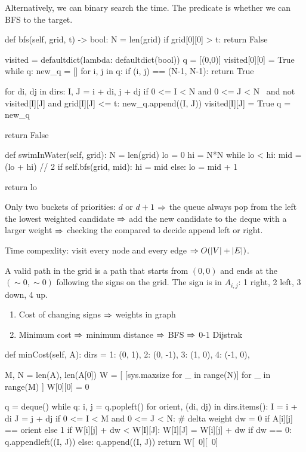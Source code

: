Alternatively, we can binary search the time. The predicate is whether we can BFS to the target. 
\begin{python}
def bfs(self, grid, t) -> bool:
  N = len(grid)
  if grid[0][0] > t: 
    return False
  
  visited = defaultdict(lambda: defaultdict(bool))
  q = [(0,0)]
  visited[0][0] = True
  while q:
    new_q = []
    for i, j in q:
      if (i, j) == (N-1, N-1):
        return True
      
      for di, dj in dirs:
        I, J = i + di, j + dj
        if 0 <= I < N and 0 <= J < N \
        and not visited[I][J] and grid[I][J] <= t:
          new_q.append((I, J))
          visited[I][J] = True
    q = new_q
    
  return False

def swimInWater(self, grid):
  N = len(grid)
  lo = 0
  hi = N*N
  while lo < hi:
    mid = (lo + hi) // 2
    if self.bfs(grid, mid):
      hi = mid
    else:
      lo = mid + 1

  return lo
\end{python}
 Only two buckets of priorities: $d$ or $d+1$ $\Rightarrow$ the queue always pop from the left the lowest weighted candidate $\Rightarrow$ add the new candidate to the deque with a larger weight $\Rightarrow$ checking the compared to decide append left or right. 

Time compexlity: visit every node and every edge $\Rightarrow O(|V| + |E|)$. 

 A valid path in the grid is a path that starts from $(0, 0)$ and ends at the $(\sim 0, \sim 0)$ following the signs on the grid. The sign is in $A_{i,j}$: 1 right, 2 left, 3 down, 4 up. 

\begin{enumerate}
\item Cost of changing signs $\Rightarrow$ weights in graph 
\item Minimum cost $\Rightarrow$ minimum distance $\Rightarrow$ BFS $\Rightarrow$ 0-1 Dijstrak
\end{enumerate}
\begin{python}
def minCost(self, A):
    dirs = {
        1: (0, 1), 
        2: (0, -1), 
        3: (1, 0), 
        4: (-1, 0),
    }
    
    M, N = len(A), len(A[0])
    W = [
        [sys.maxsize for _ in range(N)]
        for _ in range(M)
    ]
    W[0][0] = 0
    
    q = deque()
    while q:
        i, j = q.popleft()
        for orient, (di, dj) in dirs.items():
            I = i + di
            J = j + dj
            if 0 <= I < M and 0 <= J < N:
                # delta weight
                dw = 0 if A[i][j] == orient else 1
                if W[i][j] + dw < W[I][J]:
                    W[I][J] = W[i][j] + dw
                    if dw == 0:
                        q.appendleft((I, J))
                    else:
                        q.append((I, J))
    return W[~0][~0]
\end{python}
